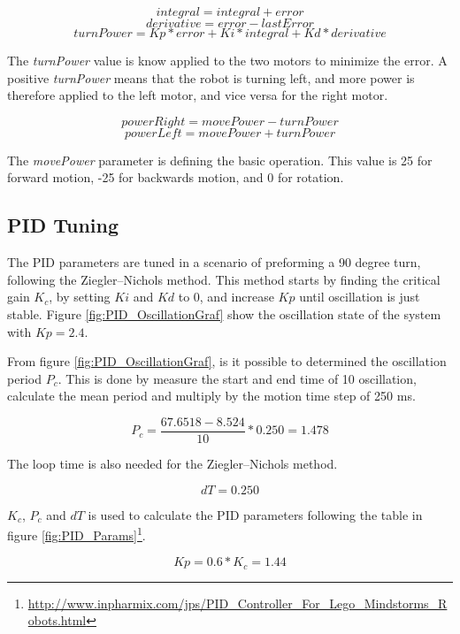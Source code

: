 $$ integral = integral + error $$
$$ derivative = error - lastError $$
$$ turnPower = Kp * error + Ki * integral + Kd * derivative $$

The \emph{turnPower} value is know applied to the two motors to minimize the error.
A positive \emph{turnPower} means that the robot is turning left, and more power is therefore applied to the left motor, and vice versa for the right motor.

$$ powerRight = movePower - turnPower $$
$$ powerLeft = movePower + turnPower $$

The \emph{movePower} parameter is defining the basic operation.
This value is 25 for forward motion, -25 for backwards motion, and 0 for rotation.

\subsection{PID Tuning}

The PID parameters are tuned in a scenario of preforming a 90 degree turn, following the Ziegler–Nichols method.
This method starts by finding the critical gain \emph{$K_c$}, by setting \emph{$Ki$} and \emph{$Kd$} to 0, and increase \emph{$Kp$} until oscillation is just stable.
Figure \ref{fig:PID_OscillationGraf} show the oscillation state of the system with \emph{$Kp = 2.4$}.


From figure \ref{fig:PID_OscillationGraf}, is it possible to determined the oscillation period \emph{$P_c$}.
This is done by measure the start and end time of 10 oscillation, calculate the mean period and multiply by the motion time step of 250 ms.

$$ P_c = \frac{67.6518-8.524}{10} * 0.250 = 1.478 $$

The loop time is also needed for the Ziegler–Nichols method.

$$ dT = 0.250 $$


\emph{$K_c$}, \emph{$P_c$} and \emph{$dT$} is used to calculate the PID parameters following the table in figure \ref{fig:PID_Params}\footnote{\url{http://www.inpharmix.com/jps/PID_Controller_For_Lego_Mindstorms_Robots.html}}.

$$ Kp = 0.6 * K_c = 1.44 $$

